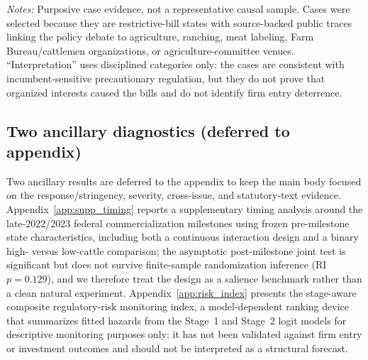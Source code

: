 \documentclass[12pt]{article}
\begin{document}
\begin{table}[htbp]
\centering
\begin{threeparttable}
\caption{Illustrative Mechanism Case Evidence: Public Agriculture and Livestock Traces}
\label{tab:mechanism_cases}
{\tiny
\renewcommand{\arraystretch}{0.88}

}
\begin{tablenotes}[flushleft]
\footnotesize
\item \textit{Notes:} Purposive case evidence, not a representative causal sample.  Cases were selected because they are restrictive-bill states with source-backed public traces linking the policy debate to agriculture, ranching, meat labeling, Farm Bureau/cattlemen organizations, or agriculture-committee venues.  ``Interpretation'' uses disciplined categories only: the cases are consistent with incumbent-sensitive precautionary regulation, but they do not prove that organized interests caused the bills and do not identify firm entry deterrence.
\end{tablenotes}
\end{threeparttable}
\end{table}

\subsection{Two ancillary diagnostics (deferred to appendix)}

Two ancillary results are deferred to the appendix to keep the main body focused on the response/stringency, severity, cross-issue, and statutory-text evidence.  Appendix~\ref{app:supp_timing} reports a supplementary timing analysis around the late-2022/2023 federal commercialization milestones using frozen pre-milestone state characteristics, including both a continuous interaction design and a binary high- versus low-cattle comparison; the asymptotic post-milestone joint test is significant but does not survive finite-sample randomization inference (RI $p = 0.129$), and we therefore treat the design as a salience benchmark rather than a clean natural experiment.  Appendix~\ref{app:risk_index} presents the stage-aware composite regulatory-risk monitoring index, a model-dependent ranking device that summarizes fitted hazards from the Stage~1 and Stage~2 logit models for descriptive monitoring purposes only; it has not been validated against firm entry or investment outcomes and should not be interpreted as a structural forecast.
\end{document}
